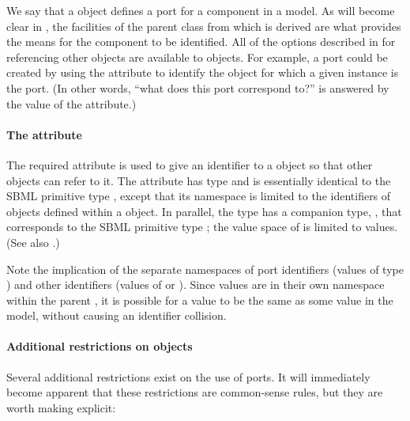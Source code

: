 We say that a \Port object defines a port for a component in a model.
As will become clear in , the facilities of the
\SBaseRef parent class from which \Port is derived are what provides the
means for the component to be identified.  All of the options described
in  for referencing other objects are available to
\Port objects.  For example, a port could be created by using the
 attribute to identify the object for which a given
\Port instance is the port.  (In other words, ``what does this port
correspond to?'' is answered by the value of the 
attribute.)


\paragraph{The \hspace*{1pt} attribute}

The required attribute  is used to give an identifier to a
\Port object so that other objects can refer to it.  The attribute has
type  and is essentially identical to the SBML
primitive type , except that its namespace is limited to
the identifiers of \Port objects defined within a \Model object.  In
parallel, the  type has a companion type,
, that corresponds to the SBML primitive type
; the value space of  is limited
to  values.  (See also .)

Note the implication of the separate namespaces of port identifiers
(values of type ) and other identifiers (values of
 or ).  Since  values
are in their own namespace within the parent \Model, it is possible for
a  value to be the same as some  value
in the model, without causing an identifier collision. 


\paragraph{Additional restrictions on  objects}

Several additional restrictions exist on the use of ports.  It will
immediately become apparent that these restrictions are common-sense
rules, but they are worth making explicit:

